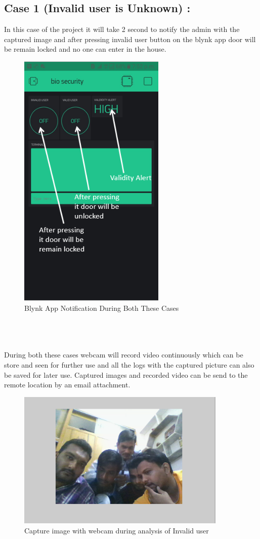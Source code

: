 \documentclass[twoside,a4paper,16pt]{book}
\begin{document}
{{\subsection*{Case 1 (Invalid user is Unknown) :}
 In this case of the project it will take 2 second to notify the admin with the captured image and after pressing invalid user button on the blynk app door will be remain locked and no one can enter in the house.
\begin{figure}[ht!]
	\begin{center}
		\includegraphics[width=7.0cm]{ff2.png}
		\caption{Blynk App Notification During Both These Cases}
	\end{center}
\end{figure}
\\
\\
\\
During both these cases webcam will record video continuously which can be store and seen for further use and all the logs with the captured picture can also be saved for later use. Captured images and recorded video can be send to the remote location by an email attachment.
 \begin{figure}[ht!]
	\begin{center}
		\includegraphics[width=10.0cm]{ff1.png}
		\caption{Capture image with webcam during analysis of Invalid user}
	\end{center}
\end{figure}
}}
\end{document}
